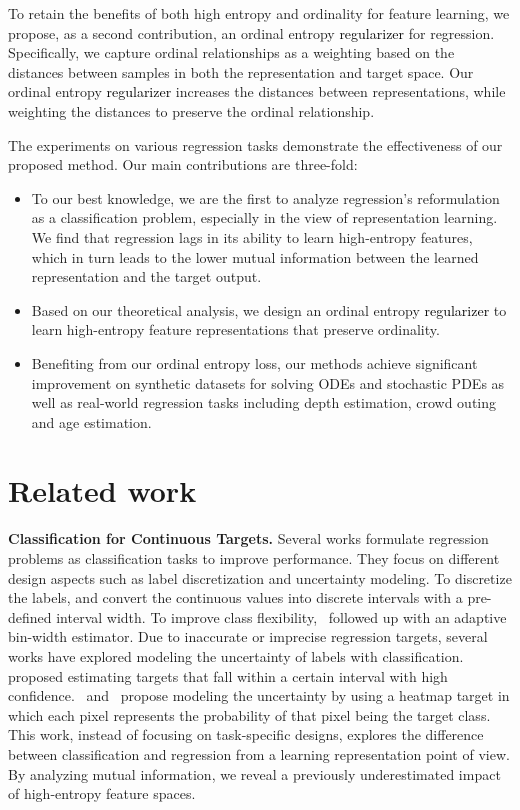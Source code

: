 \documentclass{article} %
\def\shihao{\textcolor{black}}
\begin{document}
To retain the benefits of both high entropy and ordinality for feature learning, we propose, as a second contribution, an 
ordinal entropy \shihao{regularizer}
for regression.  
Specifically, we capture ordinal relationships as a weighting based on the distances between samples in both the representation and target space. 
Our ordinal entropy \shihao{regularizer} increases the distances between representations, while weighting the distances to preserve the ordinal relationship.



The experiments on various regression tasks demonstrate the effectiveness of our proposed method.
Our main contributions are three-fold: 
\begin{itemize}
    \item To our best knowledge, we are the first to analyze regression's reformulation as a classification problem, especially in the view of representation learning. {We find that regression lags in its ability to learn high-entropy features, which in turn leads to the lower mutual information between the learned representation and the target output.}
    \item Based on our theoretical analysis, we design an ordinal entropy \shihao{regularizer} to %
    learn high-entropy feature representations that preserve ordinality.
    \item Benefiting from our ordinal entropy loss, our methods achieve significant improvement on synthetic datasets for solving ODEs and stochastic PDEs as well as real-world regression tasks including depth estimation, crowd outing and age estimation. 
\end{itemize}


\section{Related work}\label{sec:relatedwork}

\textbf{Classification for Continuous Targets.} 
Several works formulate regression problems as classification tasks to improve performance.  They focus on different design aspects such as label discretization and uncertainty modeling. 
To discretize the labels, \citet{cao2017estimating,fu2018deep} and \citet{liu2019counting} convert the continuous values into discrete intervals with a pre-defined interval width. 
To improve class flexibility,~\citet{bhat2021adabins} followed up with an adaptive bin-width estimator. 
Due to inaccurate or imprecise regression targets, several works have explored modeling the uncertainty of labels with classification. \citet{liu2019counting} proposed estimating targets that fall within a certain interval with high confidence.~\citet{tompson2014joint} and~\cite{newell2016stacked} propose modeling the uncertainty by using a heatmap target in which each pixel represents the probability of that pixel being the target class.  This work, instead of focusing on task-specific designs, explores the difference between classification and regression from a learning representation point of view.  By analyzing mutual information, we reveal a previously underestimated impact of high-entropy feature spaces. 
\end{document}
